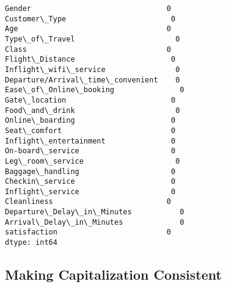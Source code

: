 \documentclass[11pt]{article}
\makeatletter
\newcommand{\boxspacing}{\kern\kvtcb@left@rule\kern\kvtcb@boxsep}
\newcommand{\prompt}[4]{
        {\ttfamily\llap{{\color{#2}[#3]:\hspace{3pt}#4}}\vspace{-\baselineskip}}
    }
\makeatother
\begin{document}
            \begin{tcolorbox}[breakable, size=fbox, boxrule=.5pt, pad at break*=1mm, opacityfill=0]
\prompt{Out}{outcolor}{13}{\boxspacing}
\begin{Verbatim}[commandchars=\\\{\}]
Gender                               0
Customer\_Type                        0
Age                                  0
Type\_of\_Travel                       0
Class                                0
Flight\_Distance                      0
Inflight\_wifi\_service                0
Departure/Arrival\_time\_convenient    0
Ease\_of\_Online\_booking               0
Gate\_location                        0
Food\_and\_drink                       0
Online\_boarding                      0
Seat\_comfort                         0
Inflight\_entertainment               0
On-board\_service                     0
Leg\_room\_service                     0
Baggage\_handling                     0
Checkin\_service                      0
Inflight\_service                     0
Cleanliness                          0
Departure\_Delay\_in\_Minutes           0
Arrival\_Delay\_in\_Minutes             0
satisfaction                         0
dtype: int64
\end{Verbatim}
\end{tcolorbox}
        
    \subsection{Making Capitalization
Consistent}\label{making-capitalization-consistent}
\end{document}
